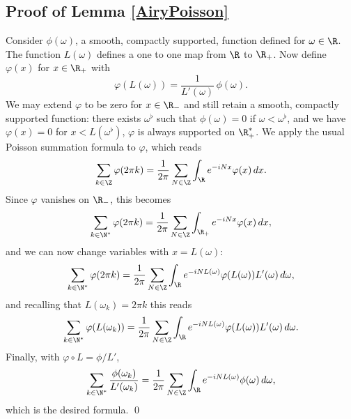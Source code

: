 \subsection{Proof of Lemma \ref{AiryPoisson}}
Consider $\phi(\omega)$, a smooth, compactly supported, function defined for $\omega \in \R$. The function $L(\omega)$ defines a one to one map from $\R$ to $\R_{+}$. Now define $\varphi(x)$ for $x\in \R_{+}$ with\vspace*{-3pt}
\[
\varphi(L(\omega))=\frac 1 {L'(\omega)}\, \phi (\omega).
\]
We may extend $\varphi$ to be zero for $x\in \R_{-}$ and still retain a smooth, compactly supported function: there exists $\omega^{\flat}$ such that $\phi(\omega)=0$ if $\omega<\omega^{\flat}$, and we have $\varphi(x)=0$ for $x<L(\omega^{\flat})$, \eg $\varphi$ is always supported on $\R_{+}^{*}$. We apply the usual Poisson summation formula to $\varphi$, which reads\vspace*{-3pt}
\[
\sum_{k\in \Z} \varphi(2\pi k)=\frac 1 {2\pi} \sum_{N\in \Z} \int_{\R} e^{-i N x}\varphi(x)\,dx.
\]
Since $\varphi$ vanishes on $\R_{-}$, this becomes\vspace*{-3pt}
\[
\sum_{k\in \N^{*}} \varphi(2\pi k)=\frac 1 {2\pi} \sum_{N\in \Z} \int_{\R_{+}} e^{-i N x}\varphi(x)\,dx,
\]
and we can now change variables with $x=L(\omega)$:\vspace*{-3pt}
\[
\sum_{k\in \N^{*}} \varphi(2\pi k)=\frac 1 {2\pi} \sum_{N\in \Z} \int_{\R} e^{-i N L(\omega)}\varphi(L(\omega))L'(\omega)\,d\omega,
\]
and recalling that $L(\omega_{k})=2\pi k$ this reads\vspace*{-3pt}
\[
\sum_{k\in \N^{*}} \varphi(L(\omega_{k}))=\frac 1 {2\pi} \sum_{N\in \Z} \int_{\R} e^{-i N L(\omega)}\varphi(L(\omega))L'(\omega)\,d\omega.
\]
Finally, with $\varphi\circ L=\phi/L'$,\vspace*{-3pt}\enlargethispage{\baselineskip}%
\[
\sum_{k\in \N^{*}} \frac {\phi(\omega_{k})}{L'(\omega_{k})}=\frac 1 {2\pi} \sum_{N\in \Z} \int_{\R} e^{-i N L(\omega)}\phi(\omega)\,d\omega,
\]
which is the desired formula. \qed

\backmatter
